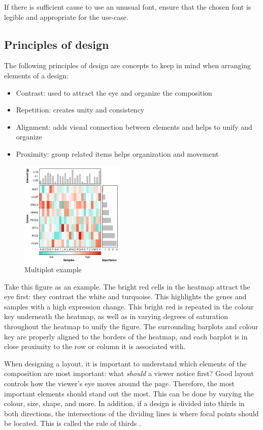 \documentclass[letterpaper]{report}\usepackage[]{graphicx}\usepackage[]{color}
\begin{document}
If there is sufficient cause to use an unusual font, ensure that the chosen font is legible and appropriate for the use-case. 

\subsection{Principles of design}
The following principles of design are concepts to keep in mind when arranging elements of a design: \cite{williams}
\begin{itemize}
\item Contrast: used to attract the eye and organize the composition
\item Repetition: creates unity and consistency
\item Alignment: adds visual connection between elements and helps to unify and organize
\item Proximity: group related items helps organization and movement
\end{itemize}

\begin{figure}[!ht]
  \begin{center}
     \includegraphics[width=50mm]{Figures/Multiplot_Ex2.png}
     \caption{Multiplot example}
  \end{center}
\end{figure}

Take this figure as an example. The bright red cells in the heatmap attract the eye first: they contrast the white and turquoise. This highlights the genes and samples with a high expression change. This bright red is repeated in the colour key underneath the heatmap, as well as in varying degrees of saturation throughout the heatmap to unify the figure. The surrounding barplots and colour key are properly aligned to the borders of the heatmap, and each barplot is in close proximity to the row or column it is associated with. 

When designing a layout, it is important to understand which elements of the composition are most important: what \textit{should} a viewer notice first? Good layout controls how the viewer's eye moves around the page. Therefore, the most important elements should stand out the most. This can be done by varying the colour, size, shape, and more. In addition, if a design is divided into thirds in both directions, the intersections of the dividing lines is where focal points should be located. This is called the rule of thirds \cite{wong3}.
\end{document}
